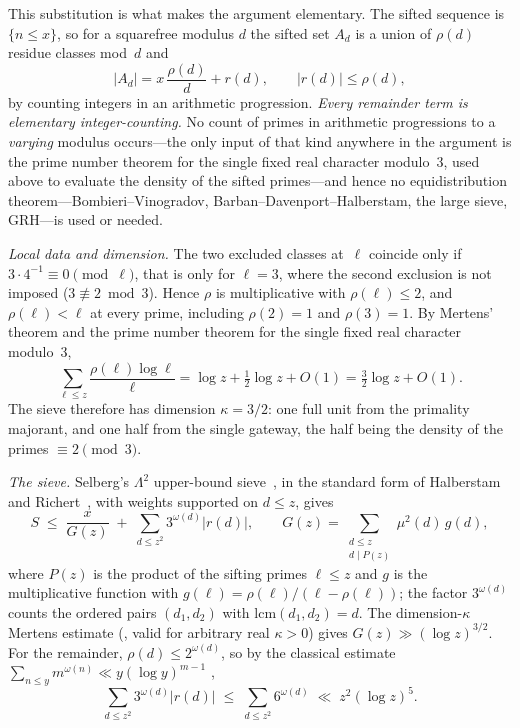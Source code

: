 \documentclass[12pt]{amsart}
\theoremstyle{definition}
\theoremstyle{remark}
\begin{document}
This substitution is what makes the argument elementary.  The sifted
sequence is $\{n \leq x\}$, so for a squarefree modulus $d$ the sifted
set $A_d$ is a union of $\rho(d)$ residue classes mod~$d$ and
\[
  |A_d| = x\,\frac{\rho(d)}{d} + r(d), \qquad |r(d)| \leq \rho(d),
\]
by counting integers in an arithmetic progression.  \emph{Every
remainder term is elementary integer-counting.}  No count of primes in
arithmetic progressions to a \emph{varying} modulus occurs---the only
input of that kind anywhere in the argument is the prime number theorem
for the single fixed real character modulo~$3$, used above to evaluate
the density of the sifted primes---and hence no equidistribution
theorem---Bombieri--Vinogradov, Barban--Davenport--Halberstam, the
large sieve, GRH---is used or needed.

\emph{Local data and dimension.}
The two excluded classes at~$\ell$ coincide only if
$3 \cdot 4^{-1} \equiv 0 \pmod \ell$, that is only for $\ell = 3$,
where the second exclusion is not imposed ($3 \not\equiv 2 \bmod 3$).
Hence $\rho$ is multiplicative with $\rho(\ell) \leq 2$, and
$\rho(\ell) < \ell$ at every prime, including $\rho(2) = 1$ and
$\rho(3) = 1$.  By Mertens' theorem and the prime number theorem for
the single fixed real character modulo~$3$,
\[
  \sum_{\ell \leq z} \frac{\rho(\ell)\log \ell}{\ell}
  = \log z + \tfrac{1}{2}\log z + O(1)
  = \tfrac{3}{2}\log z + O(1).
\]
The sieve therefore has dimension $\kappa = 3/2$: one full unit from
the primality majorant, and one half from the single gateway, the
half being the density of the primes $\equiv 2 \pmod 3$.

\emph{The sieve.}
Selberg's $\Lambda^2$ upper-bound sieve~\cite{Selberg1947}, in the
standard form of Halberstam and Richert~\cite[Ch.~3]{HalberstamRichert1974},
with weights supported on $d \leq z$, gives
\[
  S \;\leq\; \frac{x}{G(z)} \;+\; \sum_{d \leq z^2} 3^{\omega(d)}|r(d)|,
  \qquad
  G(z) = \sum_{\substack{d \leq z\\ d \mid P(z)}} \mu^2(d)\, g(d),
\]
where $P(z)$ is the product of the sifting primes $\ell \leq z$ and $g$
is the multiplicative function with
$g(\ell) = \rho(\ell)/(\ell - \rho(\ell))$; the factor $3^{\omega(d)}$
counts the ordered pairs $(d_1,d_2)$ with $\mathrm{lcm}(d_1,d_2) = d$.
The dimension-$\kappa$ Mertens estimate
(\cite[Lemma~5.3]{HalberstamRichert1974}, valid for arbitrary real
$\kappa > 0$) gives $G(z) \gg (\log z)^{3/2}$.  For the remainder,
$\rho(d) \leq 2^{\omega(d)}$, so by the classical estimate
$\sum_{n \leq y} m^{\omega(n)} \ll y (\log y)^{m-1}$
\cite[Ch.~I.3, I.5]{Tenenbaum2015},
\[
  \sum_{d \leq z^2} 3^{\omega(d)}|r(d)|
  \;\leq\; \sum_{d \leq z^2} 6^{\omega(d)}
  \;\ll\; z^2 (\log z)^5 .
\]
\end{document}
